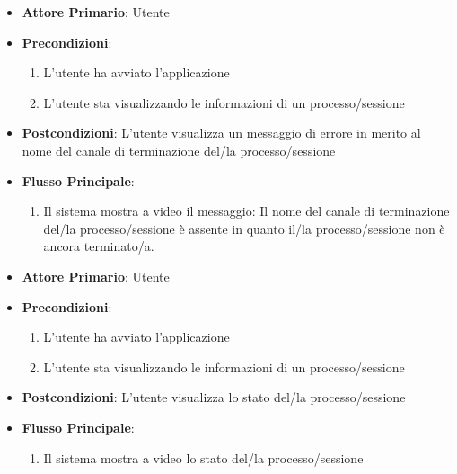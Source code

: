\begin{itemize}
    \item \textbf{Attore Primario}: Utente
    \item \textbf{Precondizioni}:
    \begin{enumerate}
        \item L'utente ha avviato l'applicazione
        \item L'utente sta visualizzando le informazioni di un processo/sessione
    \end{enumerate}
    \item \textbf{Postcondizioni}: L'utente visualizza un messaggio di errore in merito al nome del canale di terminazione del/la processo/sessione
    \item \textbf{Flusso Principale}:
        \begin{enumerate}
            \item Il sistema mostra a video il messaggio: Il nome del canale di terminazione del/la processo/sessione è assente in quanto il/la processo/sessione non è ancora terminato/a.
        \end{enumerate}
\end{itemize}

\begin{itemize}
    \item \textbf{Attore Primario}: Utente
    \item \textbf{Precondizioni}:
    \begin{enumerate}
        \item L'utente ha avviato l'applicazione
        \item L'utente sta visualizzando le informazioni di un processo/sessione
    \end{enumerate}
    \item \textbf{Postcondizioni}: L'utente visualizza lo stato del/la processo/sessione
    \item \textbf{Flusso Principale}:
        \begin{enumerate}
            \item Il sistema mostra a video lo stato del/la processo/sessione
        \end{enumerate}
\end{itemize}

